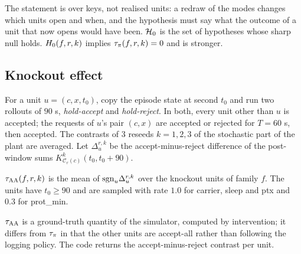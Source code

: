 \noindent The statement is over keys, not realised units: a redraw of the modes changes which units open and when, and the hypothesis must say what the outcome of a unit that now opens would have been. $\mathcal{H}_0$ is the set of hypotheses whose sharp null holds. $H_0(f, r, k)$ implies $\tau_{\pi}(f, r, k) = 0$ and is stronger.

\subsection{Knockout effect}
\label{spec:est.tauaa}

For a unit $u = (c, x, t_0)$, copy the episode state at second $t_0$ and run two rollouts of $90$ s, \emph{hold-accept} and \emph{hold-reject}. In both, every unit other than $u$ is accepted; the requests of $u$'s pair $(c, x)$ are accepted or rejected for $T = 60$ s, then accepted. The contrasts of $3$ reseeds $k = 1, 2, 3$ of the stochastic part of the plant are averaged. Let $\Delta_u^{r,k}$ be the accept-minus-reject difference of the post-window sums $K^{k}_{\mathcal{C}_r(c)}(t_0, t_0 + 90)$.

\begin{definition}
$\tau_{\mathrm{AA}}(f, r, k)$ is the mean of $\mathrm{sgn}_u \Delta_u^{r,k}$ over the knockout units of family $f$. The units have $t_0 \ge 90$ and are sampled with rate $1.0$ for carrier, sleep and ptx and $0.3$ for prot\_min.
\end{definition}

\noindent $\tau_{\mathrm{AA}}$ is a ground-truth quantity of the simulator, computed by intervention; it differs from $\tau_{\pi}$ in that the other units are accept-all rather than following the logging policy. The code returns the accept-minus-reject contrast per unit.

